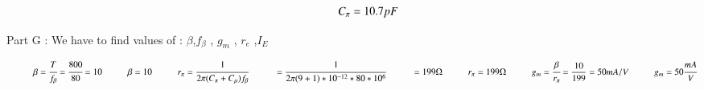\begin{enumerate}[label=\thesubsection.\arabic*.,ref=\thesubsection.\theenumi]
\begin{align}
        \vspace{0.5cm}
        
    \hspace{1cm}    C_{\pi} = 10.7 pF 

\vspace{1cm}

\end{align}

Part G : We have to find values of :
 $\beta$,$f_{\beta}$ , $g_{m}$ , $r_{e}$ ,$I_{E}$ 
  \vspace{0.5cm}
 
 \solution

\begin{align}

\hspace{1cm}    \beta = \cfrac{{T}}{f_{\beta}}
        = \cfrac{800}{80}
        = 10
        
        \vspace{0.5cm}
        
\hspace{1cm}        \beta = 10

\vspace{1cm}

    \hspace{1cm}   r_{\pi} = \cfrac{1}{2\pi(C_{\pi}+C_{\mu})f_{\beta}}
       
       \vspace{0.5cm}
       
\hspace{1cm}              = \cfrac{1}{2\pi(9+1)*{10^{-12}}*80*10^6}
              
              \vspace{0.5cm}
              
\hspace{1cm}              = 199 \ohm
        
        \vspace{0.5cm}
        
\hspace{1cm}        r_{\pi} = 199 \ohm
        
        \vspace{1cm}


\hspace{1cm}      g_{m} = \cfrac{\beta}{r_{\pi}}
        = \frac{10}{199}
        = 50 mA/V
        
        \vspace{0.5cm}
        
\hspace{1cm}        g_{m}= 50 \cfrac{mA}{V}
        

\end{align}
\end{enumerate}
